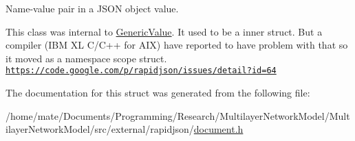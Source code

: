 Name-\/value pair in a J\+S\+ON object value. 

This class was internal to \hyperlink{classGenericValue}{Generic\+Value}. It used to be a inner struct. But a compiler (I\+BM XL C/\+C++ for A\+IX) have reported to have problem with that so it moved as a namespace scope struct. \href{https://code.google.com/p/rapidjson/issues/detail?id=64}{\tt https\+://code.\+google.\+com/p/rapidjson/issues/detail?id=64} 

The documentation for this struct was generated from the following file\+:\begin{DoxyCompactItemize}
\item 
/home/mate/\+Documents/\+Programming/\+Research/\+Multilayer\+Network\+Model/\+Multilayer\+Network\+Model/src/external/rapidjson/\hyperlink{document_8h}{document.\+h}\end{DoxyCompactItemize}
